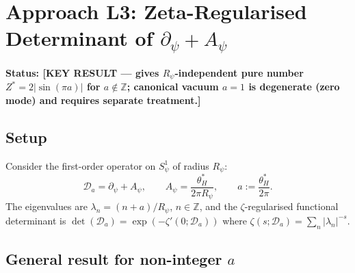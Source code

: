 \documentclass[11pt,a4paper]{article}
\theoremstyle{definition}
\theoremstyle{remark}
\begin{document}
\section{Approach L3: Zeta-Regularised Determinant of $\partial_\psi + A_\psi$}
\label{sec:L3_zetadet}

\textbf{Status: [KEY RESULT — gives $R_\psi$-independent pure number
$Z^* = 2\lvert\sin(\pi a)\rvert$ for $a\notin\mathbb{Z}$;
canonical vacuum $a=1$ is degenerate (zero mode) and requires separate treatment.]}

\subsection{Setup}

Consider the first-order operator on $S^1_\psi$ of radius $R_\psi$:
\begin{equation}
  \mathcal{D}_a = \partial_\psi + A_\psi,
  \qquad A_\psi = \frac{\theta_H^*}{2\pi R_\psi},
  \qquad a := \frac{\theta_H^*}{2\pi}.
  \label{eq:D_a}
\end{equation}
The eigenvalues are
$\lambda_n = (n + a)/R_\psi$, $n\in\mathbb{Z}$,
and the $\zeta$-regularised functional determinant is
$\det(\mathcal{D}_a) = \exp(-\zeta'(0;\mathcal{D}_a))$
where
$\zeta(s;\mathcal{D}_a) = \sum_{n}\lvert\lambda_n\rvert^{-s}$.

\subsection{General result for non-integer $a$}
\label{subsec:L3_noninteger}
\end{document}
